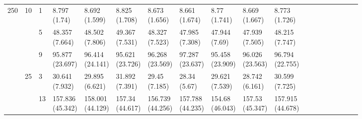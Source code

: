 \documentclass[12pt,a4paper]{article}
\begin{document}
\begin{landscape}
\begin{longtable}{lllllllllllrrrrrrrr}
\multirow[t]{9}{*}{250} & \multirow[t]{3}{*}{10} & 1 & \makecell{8.797 \\ (1.74)} & \makecell{8.692 \\ (1.599)} & \makecell{8.825 \\ (1.708)} & \makecell{8.673 \\ (1.656)} & \makecell{8.661 \\ (1.674)} & \makecell{8.77 \\ (1.741)} & \makecell{8.669 \\ (1.667)} & \makecell{8.773 \\ (1.726)} \\
 &  & 5 & \makecell{48.357 \\ (7.664)} & \makecell{48.502 \\ (7.806)} & \makecell{49.367 \\ (7.531)} & \makecell{48.327 \\ (7.523)} & \makecell{47.985 \\ (7.308)} & \makecell{47.944 \\ (7.69)} & \makecell{47.939 \\ (7.505)} & \makecell{48.215 \\ (7.747)} \\
 &  & 9 & \makecell{95.877 \\ (23.697)} & \makecell{96.414 \\ (24.141)} & \makecell{95.621 \\ (23.726)} & \makecell{96.268 \\ (23.569)} & \makecell{97.287 \\ (23.637)} & \makecell{95.458 \\ (23.909)} & \makecell{96.026 \\ (23.563)} & \makecell{96.794 \\ (22.755)} \\
\cline{2-11}
 & \multirow[t]{3}{*}{25} & 3 & \makecell{30.641 \\ (7.932)} & \makecell{29.895 \\ (6.621)} & \makecell{31.892 \\ (7.391)} & \makecell{29.45 \\ (7.185)} & \makecell{28.34 \\ (5.67)} & \makecell{29.621 \\ (7.539)} & \makecell{28.742 \\ (6.161)} & \makecell{30.599 \\ (7.725)} \\
 &  & 13 & \makecell{157.836 \\ (45.342)} & \makecell{158.001 \\ (44.129)} & \makecell{157.34 \\ (44.617)} & \makecell{156.739 \\ (44.256)} & \makecell{157.788 \\ (44.235)} & \makecell{154.68 \\ (46.043)} & \makecell{157.53 \\ (45.347)} & \makecell{157.915 \\ (44.678)} \\

\end{longtable}
\end{landscape}
\end{document}
